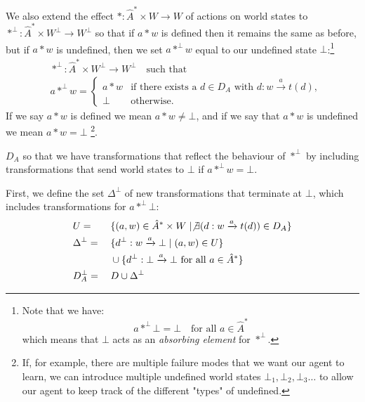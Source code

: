 We also extend the effect $\ast : \hat{A}^{*} \times W \to W$ of actions on world states to $\ast^{\bot} : \hat{A}^{*} \times W^{\bot} \to  W^{\bot}$ so that if $a \ast w$ is defined then it remains the same as before, but if $a \ast w$ is undefined, then we set $a \ast^{\bot} w$ equal to our undefined state $\bot$:\footnote{
    Note that we have:
    \begin{equation}
        a \ast^{\bot} \bot = \bot \quad \text{for all $a \in \hat{A}^{*}$}
    \end{equation}
    which means that $\bot$ acts as an \emph{absorbing element} for $\ast^{\bot}$.
}
\begin{align}
	 & \ast^{\bot} : \hat{A}^{*} \times W^{\bot} \to  W^{\bot} \quad\text{such that} \\
	 & a \ast^{\bot} w =
	\begin{cases}
		a \ast w & \text{if there exists a $d \in D_{A}$ with $d: w \xrightarrow{a} t(d)$}, \\
		\bot & \text{otherwise.}
	\end{cases}
\end{align}
If we say $a \ast w$ is defined we mean $a \ast w \neq \bot$, and if we say that $a \ast w$ is undefined we mean $a \ast w = \bot$ \footnote{
    If, for example, there are multiple failure modes that we want our agent to learn, we can introduce multiple undefined world states $\bot_{1}, \bot_{2}, \bot_{3} \dots$ to allow our agent to keep track of the different "types" of undefined.
}.

 $D_{A}$ so that we have transformations that reflect the behaviour of $\ast^{\bot}$ by including transformations that send world states to $\bot$ if $a \ast^{\bot} w = \bot$.

First, we define the set $\Delta^{\bot}$ of new transformations that terminate at $\bot$, which includes transformations for $a \ast^{\bot} \bot$:
\begin{alignat}{2}
    & U {}={} && \{ (a,w) \in \hat{A}^{*} \times W \mid \not\exists (d: w \xrightarrow{a} t(d)) \in D_{A} \} \\
    & \Delta^{\bot} {}={} && \{ d^{\bot}: w \xrightarrow{a} \bot \mid (a, w) \in U \}                                       \\
                  &       && \cup \{ d^{\bot}: \bot \xrightarrow{a} \bot \text{ for all $a \in \hat{A}^{*}$} \} \\
    & D_{A}^{\bot} = && D \cup \Delta^{\bot}
\end{alignat}

